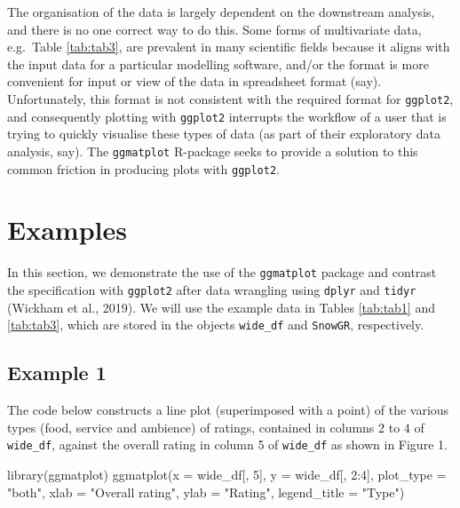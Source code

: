 \documentclass[10pt,a4paper,onecolumn]{article}
\newenvironment{Shaded}{\begin{snugshade}}{\end{snugshade}}
\newcommand{\AttributeTok}[1]{\textcolor[rgb]{0.77,0.63,0.00}{#1}}
\newcommand{\DecValTok}[1]{\textcolor[rgb]{0.00,0.00,0.81}{#1}}
\newcommand{\FunctionTok}[1]{\textcolor[rgb]{0.00,0.00,0.00}{#1}}
\newcommand{\NormalTok}[1]{#1}
\newcommand{\SpecialCharTok}[1]{\textcolor[rgb]{0.00,0.00,0.00}{#1}}
\newcommand{\StringTok}[1]{\textcolor[rgb]{0.31,0.60,0.02}{#1}}
\begin{document}
The organisation of the data is largely dependent on the downstream
analysis, and there is no one correct way to do this. Some forms of
multivariate data, e.g.~Table \ref{tab:tab3}, are prevalent in many
scientific fields because it aligns with the input data for a particular
modelling software, and/or the format is more convenient for input or
view of the data in spreadsheet format (say). Unfortunately, this format
is not consistent with the required format for \texttt{ggplot2}, and
consequently plotting with \texttt{ggplot2} interrupts the workflow of a
user that is trying to quickly visualise these types of data (as part of
their exploratory data analysis, say). The \texttt{ggmatplot} R-package
seeks to provide a solution to this common friction in producing plots
with \texttt{ggplot2}.

\hypertarget{examples}{%
\section{Examples}\label{examples}}

In this section, we demonstrate the use of the \texttt{ggmatplot}
package and contrast the specification with \texttt{ggplot2} after data
wrangling using \texttt{dplyr} and \texttt{tidyr} (Wickham et al.,
2019). We will use the example data in Tables \ref{tab:tab1} and
\ref{tab:tab3}, which are stored in the objects \texttt{wide\_df} and
\texttt{SnowGR}, respectively.

\hypertarget{example-1}{%
\subsection{Example 1}\label{example-1}}

The code below constructs a line plot (superimposed with a point) of the
various types (food, service and ambience) of ratings, contained in
columns 2 to 4 of \texttt{wide\_df}, against the overall rating in
column 5 of \texttt{wide\_df} as shown in Figure 1.

\begin{Shaded}
\begin{Highlighting}[]
\FunctionTok{library}\NormalTok{(ggmatplot)}
\FunctionTok{ggmatplot}\NormalTok{(}\AttributeTok{x =}\NormalTok{ wide\_df[, }\DecValTok{5}\NormalTok{], }\AttributeTok{y =}\NormalTok{ wide\_df[, }\DecValTok{2}\SpecialCharTok{:}\DecValTok{4}\NormalTok{], }\AttributeTok{plot\_type =} \StringTok{"both"}\NormalTok{,}
          \AttributeTok{xlab =} \StringTok{"Overall rating"}\NormalTok{,  }\AttributeTok{ylab =} \StringTok{"Rating"}\NormalTok{, }\AttributeTok{legend\_title =} \StringTok{"Type"}\NormalTok{) }
\end{Highlighting}
\end{Shaded}
\end{document}
